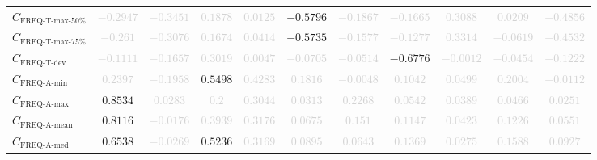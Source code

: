 \documentclass{standalone}
\newcommand{\freqmaxfiftyname}{\text{FREQ-T-max-50\%}}
\newcommand{\freqmaxfifty}{C_{\freqmaxfiftyname}}
\newcommand{\freqmaxseventyfivename}{\text{FREQ-T-max-75\%}}
\newcommand{\freqmaxseventyfive}{C_{\freqmaxseventyfivename}}
\newcommand{\freqdevname}{\text{FREQ-T-dev}}
\newcommand{\freqdev}{C_{\freqdevname}}
\newcommand{\actfreqminname}{\text{FREQ-A-min}}
\newcommand{\actfreqmin}{C_{\actfreqminname}}
\newcommand{\actfreqmaxname}{\text{FREQ-A-max}}
\newcommand{\actfreqmax}{C_{\actfreqmaxname}}
\newcommand{\actfreqmeanname}{\text{FREQ-A-mean}}
\newcommand{\actfreqmean}{C_{\actfreqmeanname}}
\newcommand{\actfreqmedianname}{\text{FREQ-A-med}}
\newcommand{\actfreqmedian}{C_{\actfreqmedianname}}
\begin{document}
\begin{tabular}{lcccccccccc}
$\freqmaxfifty$ & \textcolor{lightgray}{$-0.2947$} & \textcolor{lightgray}{$-0.3451$} & \textcolor{lightgray}{$0.1878$} & \textcolor{lightgray}{$0.0125$} & $-0.5796$ & \textcolor{lightgray}{$-0.1867$} & \textcolor{lightgray}{$-0.1665$} & \textcolor{lightgray}{$0.3088$} & \textcolor{lightgray}{$0.0209$} & \textcolor{lightgray}{$-0.4856$} \\ 
$\freqmaxseventyfive$ & \textcolor{lightgray}{$-0.261$} & \textcolor{lightgray}{$-0.3076$} & \textcolor{lightgray}{$0.1674$} & \textcolor{lightgray}{$0.0414$} & $-0.5735$ & \textcolor{lightgray}{$-0.1577$} & \textcolor{lightgray}{$-0.1277$} & \textcolor{lightgray}{$0.3314$} & \textcolor{lightgray}{$-0.0619$} & \textcolor{lightgray}{$-0.4532$} \\ 
$\freqdev$ & \textcolor{lightgray}{$-0.1111$} & \textcolor{lightgray}{$-0.1657$} & \textcolor{lightgray}{$0.3019$} & \textcolor{lightgray}{$0.0047$} & \textcolor{lightgray}{$-0.0705$} & \textcolor{lightgray}{$-0.0514$} & $-0.6776$ & \textcolor{lightgray}{$-0.0012$} & \textcolor{lightgray}{$-0.0454$} & \textcolor{lightgray}{$-0.1222$} \\ 
$\actfreqmin$ & \textcolor{lightgray}{$0.2397$} & \textcolor{lightgray}{$-0.1958$} & $0.5498$ & \textcolor{lightgray}{$0.4283$} & \textcolor{lightgray}{$0.1816$} & \textcolor{lightgray}{$-0.0048$} & \textcolor{lightgray}{$0.1042$} & \textcolor{lightgray}{$0.0499$} & \textcolor{lightgray}{$0.2004$} & \textcolor{lightgray}{$-0.0112$} \\ 
$\actfreqmax$ & $0.8534$ & \textcolor{lightgray}{$0.0283$} & \textcolor{lightgray}{$0.2$} & \textcolor{lightgray}{$0.3044$} & \textcolor{lightgray}{$0.0313$} & \textcolor{lightgray}{$0.2268$} & \textcolor{lightgray}{$0.0542$} & \textcolor{lightgray}{$0.0389$} & \textcolor{lightgray}{$0.0466$} & \textcolor{lightgray}{$0.0251$} \\ 
$\actfreqmean$ & $0.8116$ & \textcolor{lightgray}{$-0.0176$} & \textcolor{lightgray}{$0.3939$} & \textcolor{lightgray}{$0.3176$} & \textcolor{lightgray}{$0.0675$} & \textcolor{lightgray}{$0.151$} & \textcolor{lightgray}{$0.1147$} & \textcolor{lightgray}{$0.0423$} & \textcolor{lightgray}{$0.1226$} & \textcolor{lightgray}{$0.0551$} \\ 
$\actfreqmedian$ & $0.6538$ & \textcolor{lightgray}{$-0.0269$} & $0.5236$ & \textcolor{lightgray}{$0.3169$} & \textcolor{lightgray}{$0.0895$} & \textcolor{lightgray}{$0.0643$} & \textcolor{lightgray}{$0.1369$} & \textcolor{lightgray}{$0.0275$} & \textcolor{lightgray}{$0.1588$} & \textcolor{lightgray}{$0.0927$} \\ 

\end{tabular}
\end{document}
